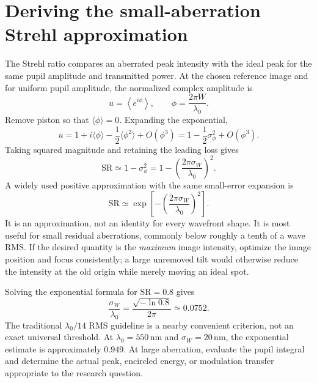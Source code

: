 \section{Deriving the small-aberration Strehl approximation}
The Strehl ratio compares an aberrated peak intensity with the ideal peak
for the same pupil amplitude and transmitted power. At the chosen reference
image and for uniform pupil amplitude, the normalized complex amplitude is
\begin{equation}
 u=\left\langle e^{i\phi}\right\rangle,
 \qquad \phi=\frac{2\pi W}{\lambda_0}.
\end{equation}
Remove piston so that $\langle\phi\rangle=0$. Expanding the exponential,
\begin{equation}
 u=1+i\langle\phi\rangle-\frac12\langle\phi^2\rangle
       +O(\phi^3)
   =1-\frac12\sigma_\phi^2+O(\phi^3).
\end{equation}
Taking squared magnitude and retaining the leading loss gives
\begin{equation}
 \mathrm{SR}\simeq1-\sigma_\phi^2
       =1-\left(\frac{2\pi\sigma_W}{\lambda_0}\right)^2.
\end{equation}
A widely used positive approximation with the same small-error expansion is
\begin{equation}
 \boxed{\mathrm{SR}\simeq
      \exp\left[-\left(\frac{2\pi\sigma_W}{\lambda_0}\right)^2\right].}
 \label{ab:strehl}
\end{equation}
It is an approximation, not an identity for every wavefront shape. It is
most useful for small residual aberrations, commonly below roughly a tenth
of a wave RMS. If the desired quantity is the \emph{maximum} image intensity,
optimize the image position and focus consistently; a large unremoved tilt
would otherwise reduce the intensity at the old origin while merely moving
an ideal spot.

Solving the exponential formula for $\mathrm{SR}=0.8$ gives
\begin{equation}
 \frac{\sigma_W}{\lambda_0}
   =\frac{\sqrt{-\ln0.8}}{2\pi}\simeq0.0752.
\end{equation}
The traditional $\lambda_0/14$ RMS guideline is a nearby convenient criterion,
not an exact universal threshold. At $\lambda_0=550\,\mathrm{nm}$ and
$\sigma_W=20\,\mathrm{nm}$, the exponential estimate is approximately
$0.949$. At large aberration, evaluate the pupil integral and determine the
actual peak, encircled energy, or modulation transfer appropriate to the
research question.

